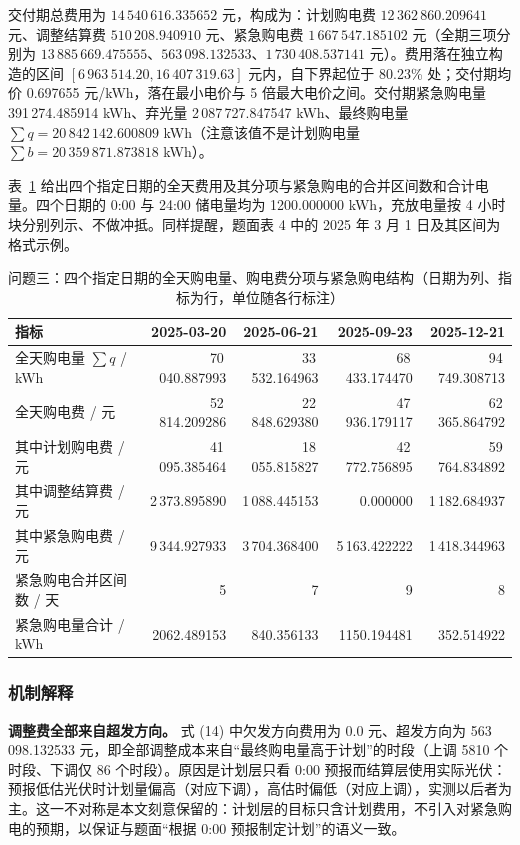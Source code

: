 交付期总费用为 $14\,540\,616.335652$ 元，构成为：计划购电费 $12\,362\,860.209641$ 元、调整结算费 $510\,208.940910$ 元、紧急购电费 $1\,667\,547.185102$ 元（全期三项分别为 $13\,885\,669.475555$、$563\,098.132533$、$1\,730\,408.537141$ 元）。费用落在独立构造的区间 $[6\,963\,514.20,16\,407\,319.63]$ 元内，自下界起位于 80.23\% 处；交付期均价 0.697655 元/kWh，落在最小电价与 5 倍最大电价之间。交付期紧急购电量 391\,274.485914 kWh、弃光量 2\,087\,727.847547 kWh、最终购电量 $\sum q=20\,842\,142.600809$ kWh（注意该值不是计划购电量 $\sum b=20\,359\,871.873818$ kWh）。

表~\ref{tab:p3a} 给出四个指定日期的全天费用及其分项与紧急购电的合并区间数和合计电量。四个日期的 0:00 与 24:00 储电量均为 1200.000000 kWh，充放电量按 4 小时块分别列示、不做冲抵。同样提醒，题面表 4 中的 2025 年 3 月 1 日及其区间为格式示例。

\begin{table}[htbp]
\centering
\small
\caption{问题三：四个指定日期的全天购电量、购电费分项与紧急购电结构（日期为列、指标为行，单位随各行标注）}
\label{tab:p3a}
\begin{tabular}{lrrrr}
\toprule
指标 & 2025-03-20 & 2025-06-21 & 2025-09-23 & 2025-12-21 \\
\midrule
全天购电量 $\sum q$ / kWh & 70\,040.887993 & 33\,532.164963 & 68\,433.174470 & 94\,749.308713 \\
全天购电费 / 元 & 52\,814.209286 & 22\,848.629380 & 47\,936.179117 & 62\,365.864792 \\
\quad 其中计划购电费 / 元 & 41\,095.385464 & 18\,055.815827 & 42\,772.756895 & 59\,764.834892 \\
\quad 其中调整结算费 / 元 & 2\,373.895890 & 1\,088.445153 & 0.000000 & 1\,182.684937 \\
\quad 其中紧急购电费 / 元 & 9\,344.927933 & 3\,704.368400 & 5\,163.422222 & 1\,418.344963 \\
\midrule
紧急购电合并区间数 / 天 & 5 & 7 & 9 & 8 \\
紧急购电量合计 / kWh & 2062.489153 & 840.356133 & 1150.194481 & 352.514922 \\
\bottomrule
\end{tabular}
\end{table}

\subsubsection{机制解释}

\textbf{调整费全部来自超发方向。} 式 (14) 中欠发方向费用为 $0.0$ 元、超发方向为 563\,098.132533 元，即全部调整成本来自“最终购电量高于计划”的时段（上调 5810 个时段、下调仅 86 个时段）。原因是计划层只看 0:00 预报而结算层使用实际光伏：预报低估光伏时计划量偏高（对应下调），高估时偏低（对应上调），实测以后者为主。这一不对称是本文刻意保留的：计划层的目标只含计划费用，不引入对紧急购电的预期，以保证与题面“根据 0:00 预报制定计划”的语义一致。

